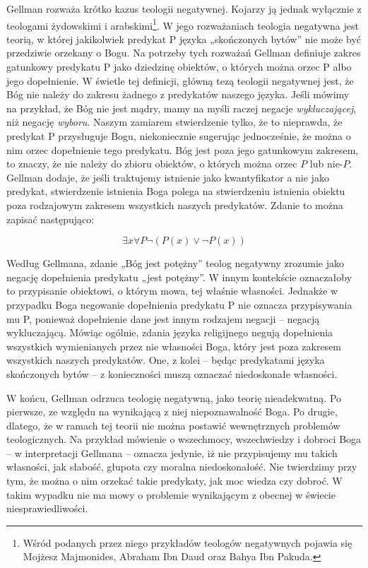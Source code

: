 Gellman rozważa krótko kazus teologii negatywnej. Kojarzy ją jednak
wyłącznie z teologami żydowskimi i arabskimi\footnote{Wśród podanych
przez niego przykładów teologów negatywnych pojawia się Mojżesz
Majmonides, Abraham Ibn Daud oraz Bahya Ibn Pakuda. }. W jego
rozważaniach teologia negatywna jest teorią, w której jakikolwiek
predykat P języka „skończonych bytów” nie może być przedziwie orzekany
o Bogu. Na potrzeby tych rozważań Gellman definiuje zakres gatunkowy
predykatu P jako dziedzinę obiektów, o których można orzec P albo jego
dopełnienie. W świetle tej definicji, główną tezą teologii negatywnej
jest, że Bóg nie należy do zakresu żadnego z predykatów naszego języka.
Jeśli mówimy na przykład, że Bóg nie jest mądry, mamy na myśli raczej
negacje \textit{wykluczającej}, niż negację \textit{wyboru}. Naszym
zamiarem stwierdzenie tylko, że to nieprawda, że predykat P przysługuje
Bogu, niekoniecznie sugerując jednocześnie, że można o nim orzec
dopełnienie tego predykatu. Bóg jest poza jego gatunkowym zakresem, to
znaczy, że nie należy do zbioru obiektów, o których można orzec $P$ lub
nie-$P$. Gellman dodaje, że jeśli traktujemy istnienie jako kwantyfikator
a nie jako predykat, stwierdzenie istnienia Boga polega na stwierdzeniu
istnienia obiektu poza rodzajowym zakresem wszystkich naszych
predykatów. Zdanie to można zapisać następująco:

\begin{equation}\label{gellman}
    \exists x \forall P \neg
(P(x) \lor \neg P(x))
\end{equation}


Według Gellmana, zdanie „Bóg jest potężny” teolog negatywny zrozumie
jako negację dopełnienia predykatu „jest potężny”. W innym kontekście
oznaczałoby to przypisanie obiektowi, o którym mowa, tej właśnie
własności. Jednakże w przypadku Boga negowanie dopełnienia predykatu P
nie oznacza przypisywania mu P, ponieważ dopełnienie dane jest innym
rodzajem negacji -- negacją wykluczającą. Mówiąc ogólnie, zdania języka
religijnego negują dopełnienia wszystkich wymienianych przez nie
własności Boga, który jest poza zakresem wszystkich naszych predykatów.
One, z kolei -- będąc predykatami języka skończonych bytów -- z
konieczności muszą oznaczać niedoskonałe własności.

W końcu, Gellman odrzuca teologię negatywną, jako teorię nieadekwatną.
Po pierwsze, ze względu na wynikającą z niej niepoznawalność Boga. Po
drugie, dlatego, że w ramach tej teorii nie można postawić wewnętrznych
problemów teologicznych. Na przykład mówienie o wszechmocy,
wszechwiedzy i dobroci Boga -- w interpretacji Gellmana -- oznacza
jedynie, iż nie przypisujemy mu takich własności, jak słabość, głupota
czy moralna niedoskonałość. Nie twierdzimy przy tym, że można o nim
orzekać takie predykaty, jak moc wiedza czy dobroć. W takim wypadku nie
ma mowy o problemie wynikającym z obecnej w świecie niesprawiedliwości.

